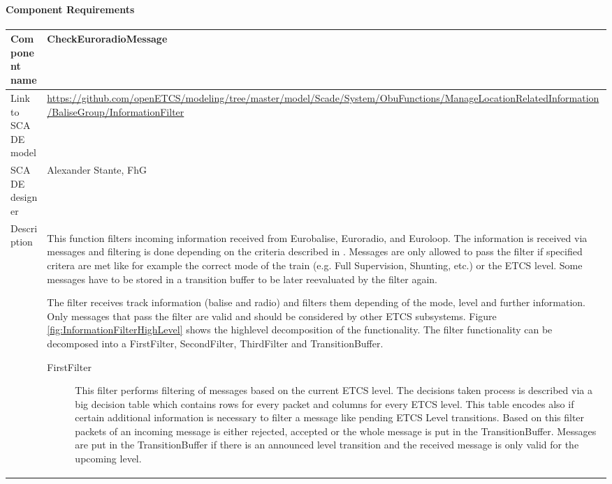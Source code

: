 
\paragraph{Component Requirements}

\begin{longtable}{p{}p{}}
\toprule
Component name			& CheckEuroradioMessage \\
\midrule
Link to SCADE model		& {\footnotesize \url{https://github.com/openETCS/modeling/tree/master/model/Scade/System/ObuFunctions/ManageLocationRelatedInformation/BaliseGroup/InformationFilter}} \\
\midrule
SCADE designer			& Alexander Stante, FhG \\
\midrule
Description				& This function filters incoming information received from Eurobalise, Euroradio, and Euroloop. The information is received via messages and filtering is done depending on the criteria described in \cite[Chapter~4.8]{subset-026}. Messages are only allowed to pass the filter if specified critera are met like for example the correct mode of the train (e.g. Full Supervision, Shunting, etc.) or the ETCS level. Some messages have to be stored in a transition buffer to be later reevaluated by the filter again.\newline

The filter receives track information (balise and radio) and filters them depending of the mode, level and further information. Only messages that pass the filter are valid and should be considered by other ETCS subsystems. Figure \ref{fig:InformationFilterHighLevel} shows the high\-level decomposition of the functionality. The filter functionality can be decomposed into a FirstFilter, SecondFilter, ThirdFilter and TransitionBuffer.

\begin{description}
\item[FirstFilter] This filter performs filtering of messages
based on the current ETCS level. The decisions taken process is
described via a big decision table which contains rows for every
packet and columns for every ETCS level. This table encodes also if
certain additional information is necessary to filter a message like
pending ETCS Level transitions. Based on this filter packets of an
incoming message is either rejected, accepted or the whole message is
put in the TransitionBuffer. Messages are put in the TransitionBuffer
if there is an announced level transition and the received message is
only valid for the upcoming level.


\end{description}
\end{longtable}
